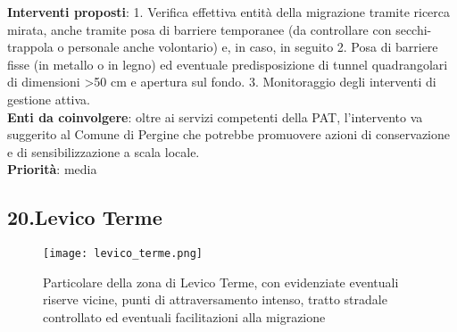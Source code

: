 \documentclass[11pt,a4paper,twoside]{memoir}
\begin{document}
\textbf{Interventi proposti}: 1. Verifica effettiva entità della migrazione tramite ricerca mirata, anche tramite posa di barriere temporanee (da controllare con secchi-trappola o personale anche volontario) e, in caso, in seguito 2. Posa di barriere fisse (in metallo o in legno) ed eventuale predisposizione di tunnel quadrangolari di dimensioni >50 cm e apertura sul fondo. 3. Monitoraggio degli interventi di gestione attiva. \\
\textbf{Enti da coinvolgere}: oltre ai servizi competenti della PAT, l’intervento va suggerito al Comune di Pergine che potrebbe promuovere azioni di conservazione e di sensibilizzazione a scala locale. \\
\textbf{Priorità}: media \\



\newpage
\begin{tcolorbox}[breakable,colback=white,colframe=green,width=10cm]
\subsection{20.Levico Terme}
\end{tcolorbox}

\begin{figure}[H]
\label{fig:map_levico}
\centering
  \texttt{[image: levico\_terme.png]}
\caption{Particolare della zona di Levico Terme, con evidenziate eventuali riserve vicine, punti di attraversamento intenso, tratto stradale controllato ed eventuali facilitazioni alla migrazione}
\end{figure}
\end{document}
